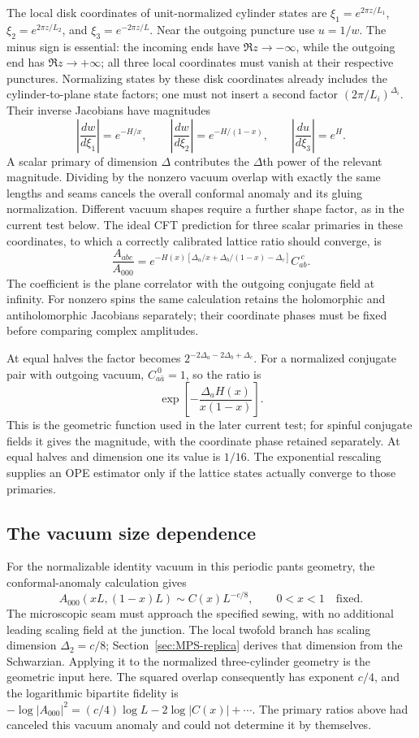 The local disk coordinates of unit-normalized cylinder states are
$\xi_1=e^{2\pi z/L_1}$, $\xi_2=e^{2\pi z/L_2}$, and
$\xi_3=e^{-2\pi z/L}$. Near the outgoing puncture use $u=1/w$.
The minus sign is essential: the incoming ends have
$\Re z\to-\infty$, while the outgoing end has
$\Re z\to+\infty$; all three local coordinates must vanish
at their respective punctures. Normalizing states by these disk
coordinates already includes the cylinder-to-plane state factors;
one must not insert a second factor $(2\pi/L_i)^{\Delta_i}$.
Their inverse Jacobians have magnitudes
\[
 \left|\frac{dw}{d\xi_1}\right|=e^{-H/x},\qquad
 \left|\frac{dw}{d\xi_2}\right|=e^{-H/(1-x)},\qquad
 \left|\frac{du}{d\xi_3}\right|=e^H.
\]
A scalar primary of dimension $\Delta$ contributes the
$\Delta$th power of the relevant magnitude. Dividing by the
nonzero vacuum overlap with exactly the same lengths and seams
cancels the overall conformal anomaly and its gluing normalization.
Different vacuum shapes require a further shape factor, as in
the current test below.
The ideal CFT prediction for three scalar primaries in these coordinates,
to which a correctly calibrated lattice ratio should converge, is
\begin{equation}
 \frac{A_{abc}}{A_{000}}
 =e^{-H(x)[\Delta_a/x+\Delta_b/(1-x)-\Delta_c]}
       C_{ab}^{\ c}.
 \label{eq:primary-pants-factor}
\end{equation}
The coefficient is the plane correlator with the outgoing
conjugate field at infinity. For nonzero spins the same
calculation retains the holomorphic and antiholomorphic
Jacobians separately; their coordinate phases must be fixed
before comparing complex amplitudes.

At equal halves the factor becomes
$2^{-2\Delta_a-2\Delta_b+\Delta_c}$. For a normalized
conjugate pair with outgoing vacuum, $C_{a\bar a}^{\ 0}=1$,
so the ratio is
\[
 \exp\!\left[-\frac{\Delta_aH(x)}{x(1-x)}\right].
\]
This is the geometric function used in the later current test;
for spinful conjugate fields it gives the magnitude, with the
coordinate phase retained separately. At equal halves and
dimension one its value is $1/16$.
The exponential rescaling supplies an OPE estimator only if
the lattice states actually converge to those primaries.

\subsection{The vacuum size dependence}

For the normalizable identity vacuum in this periodic pants geometry,
the conformal-anomaly calculation gives
\[
 A_{000}(xL,(1-x)L)\sim C(x)L^{-c/8},\qquad 0<x<1
 \quad\text{fixed}.
\]
The microscopic seam must approach the specified sewing, with no
additional leading scaling field at the junction. The local twofold
branch has scaling dimension $\Delta_2=c/8$; Section~\ref{sec:MPS-replica}
derives that dimension from the Schwarzian. Applying it to the
normalized three-cylinder geometry is the geometric input here.
The squared overlap consequently has exponent $c/4$, and the
logarithmic bipartite fidelity is
$-\log|A_{000}|^2=(c/4)\log L-2\log|C(x)|+\cdots$.
The primary ratios above had canceled this vacuum anomaly and could
not determine it by themselves.

